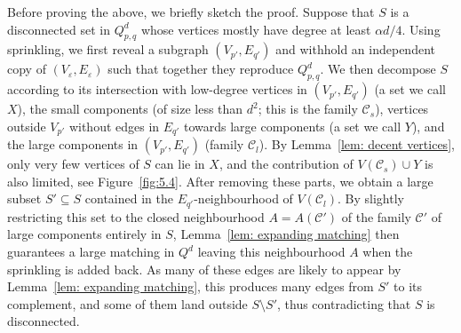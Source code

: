 \documentclass{article}
\theoremstyle{definition}
\newcommand{\eps}{\varepsilon}
\newcommand{\cC}{\mathcal{C}}
\begin{document}
Before proving the above, we briefly sketch the proof. 
Suppose that $S$ is a disconnected set in $Q^d_{p,q}$ whose vertices mostly have degree at least $\alpha d/4$. 
Using sprinkling, we first reveal a subgraph $(V_{p'},E_{q'})$ and withhold an independent copy of $(V_\eps,E_\eps)$ such that together they reproduce $Q^d_{p,q}$. 
We then decompose $S$ according to its intersection with low-degree vertices in $(V_{p'},E_{q'})$ (a set we call $X$), 
the small components (of size less than $d^2$; this is the family $\cC_s$), vertices outside $V_{p'}$ without edges in $E_{q'}$ towards large components (a set we call $Y$), 
and the large components in $(V_{p'},E_{q'})$ (family $\cC_l$). 
By Lemma~\ref{lem: decent vertices}, only very few vertices of $S$ can lie in $X$, and the contribution of $V(\cC_s)\cup Y$ is also limited, see Figure~\ref{fig:5.4}. 
After removing these parts, we obtain a large subset $S'\subseteq S$ contained in the $E_{q'}$-neighbourhood of $V(\cC_l)$. 
By slightly restricting this set to the closed neighbourhood $A=A(\cC')$ of the family $\cC'$ of large components entirely in $S$,
Lemma~\ref{lem: expanding matching} then guarantees a large matching in $Q^d$ leaving this neighbourhood $A$ when the sprinkling is added back. 
As many of these edges are likely to appear by Lemma~\ref{lem: expanding matching}, this produces many edges from $S'$ to its complement, and some of them land outside $S\setminus S'$, thus contradicting that $S$ is disconnected.
\end{document}
